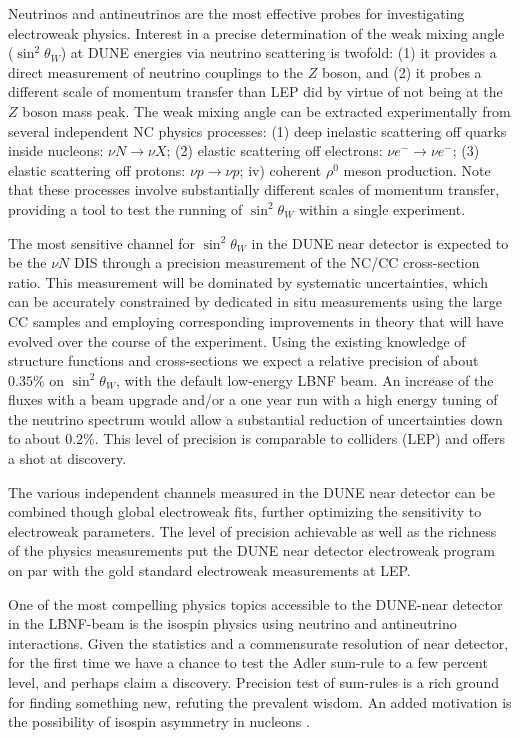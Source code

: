 Neutrinos and antineutrinos are the most effective probes for
investigating electroweak physics.  Interest in a precise
determination of the weak mixing angle ($\sin^2 \theta_W$) at DUNE
energies via neutrino scattering is twofold: (1) it provides a direct
measurement of neutrino couplings to the $Z$ boson, and (2) it probes
a different scale of momentum transfer than LEP did by virtue of not
being at the $Z$ boson mass peak.
% 
The weak mixing angle can be extracted experimentally from several
independent NC physics processes: (1) deep inelastic scattering off
quarks inside nucleons: $\nu N \to \nu X$; (2) elastic scattering off
electrons: $\nu e^- \to \nu e^-$; (3) elastic scattering off protons:
$\nu p \to \nu p$; iv) coherent $\rho^0$ meson production.  Note that
these processes involve substantially different scales of momentum
transfer, providing a tool to test the running of $\sin^2 \theta_W$
within a single experiment.

The most sensitive channel for $\sin^2 \theta_W$ in the DUNE near
detector is expected to be the $\nu N$ DIS through a precision
measurement of the NC/CC cross-section
ratio. This measurement will be dominated by
systematic uncertainties, which can be accurately constrained by
dedicated in situ measurements using the large CC samples and
employing corresponding improvements in theory that will have evolved
over the course of the experiment. Using the existing knowledge of
structure functions and cross-sections we expect a relative precision
of about $0.35\%$ on $\sin^2 \theta_W$, with the default low-energy
LBNF beam. An increase of the fluxes with a beam upgrade and/or a one
year run with a high energy tuning of the neutrino spectrum would
allow a substantial reduction of uncertainties down to about $0.2\%$.
This level of precision is comparable to colliders (LEP) and offers a
shot at discovery.
 
The various independent channels measured in the DUNE near detector
can be combined though global electroweak fits, further optimizing the
sensitivity to electroweak parameters. The level of precision
achievable as well as the richness of the physics measurements put the
DUNE near detector electroweak program on par with the gold standard
electroweak measurements at LEP.

One of the most compelling physics topics accessible to the DUNE-near
detector in the LBNF-beam is the isospin physics using neutrino and
antineutrino interactions. Given the statistics and a commensurate
resolution of near detector, for the first time we have a chance to
test the Adler sum-rule to a few percent level, and perhaps claim a
discovery.  Precision test of sum-rules is a rich ground for finding
something new, refuting the prevalent wisdom.  An added motivation is
the possibility of isospin asymmetry in nucleons .

